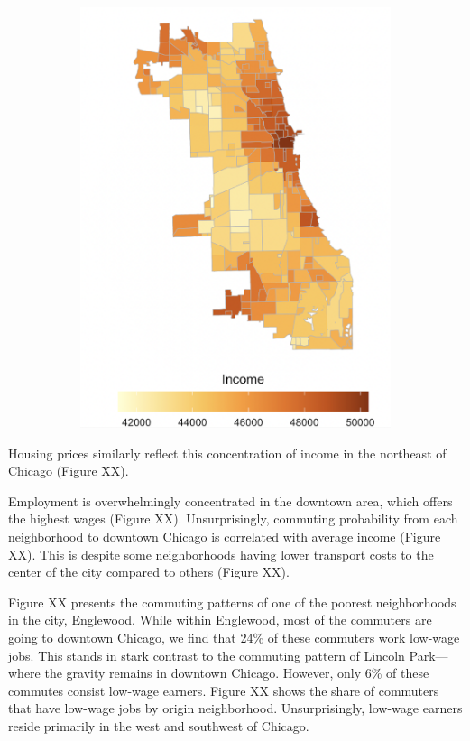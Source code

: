 \documentclass[12pt]{article}
\begin{document}
\begin{figure}[h!]
\begin{subfigure}[b]{0.45\textwidth}
         \includegraphics[width=\linewidth]{Pset1/Figures/income_map.png}
        \label{fig:income_divide}
    \end{subfigure}
\end{figure}



Housing prices similarly reflect this concentration of income in the northeast of Chicago (Figure XX). 

Employment is overwhelmingly concentrated in the downtown area, which offers the highest wages (Figure XX). Unsurprisingly, commuting probability from each neighborhood to downtown Chicago is correlated with average income (Figure XX). This is despite some neighborhoods having lower transport costs to the center of the city compared to others (Figure XX). 

Figure XX presents the commuting patterns of one of the poorest neighborhoods in the city, Englewood. While within Englewood, most of the commuters are going to downtown Chicago, we find that 24\% of these commuters work low-wage jobs. This stands in stark contrast to the commuting pattern of Lincoln Park---where the gravity remains in downtown Chicago. However, only 6\% of these commutes consist low-wage earners. Figure XX shows the share of commuters that have low-wage jobs by origin neighborhood. Unsurprisingly, low-wage earners reside primarily in the west and southwest of Chicago. 
\end{document}
